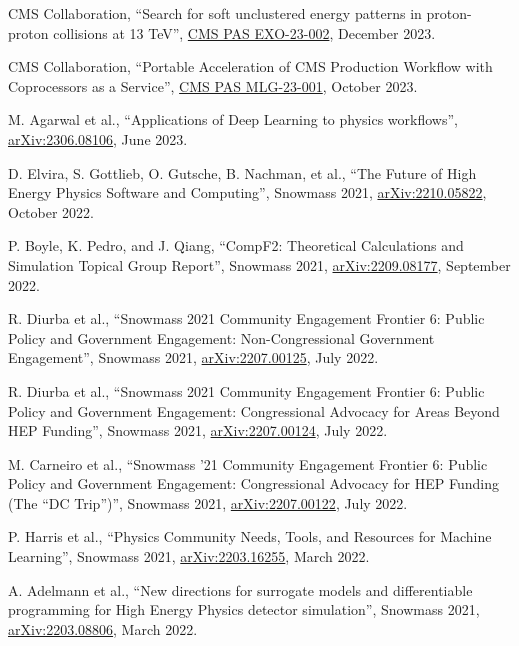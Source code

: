 \begin{description}[leftmargin=12pt,font=\normalfont,labelsep=0em]
\item CMS Collaboration, ``Search for soft unclustered energy patterns in proton-proton collisions at 13 TeV'', \href{http://cds.cern.ch/record/2883117}{CMS PAS EXO-23-002}, December 2023. %
\item CMS Collaboration, ``Portable Acceleration of CMS Production Workflow with Coprocessors as a Service'', \href{http://cds.cern.ch/record/2872973}{CMS PAS MLG-23-001}, October 2023. %
\item M. Agarwal et al., ``Applications of Deep Learning to physics workflows'', \href{https://arxiv.org/abs/2306.08106}{arXiv:2306.08106}, June 2023. %
\item D. Elvira, S. Gottlieb, O. Gutsche, B. Nachman, et al., ``The Future of High Energy Physics Software and Computing'', Snowmass 2021, \href{https://arxiv.org/abs/2210.05822}{arXiv:2210.05822}, October 2022. %
\item P. Boyle, K. Pedro, and J. Qiang, ``CompF2: Theoretical Calculations and Simulation Topical Group Report'', Snowmass 2021, \href{https://arxiv.org/abs/2209.08177}{arXiv:2209.08177}, September 2022. %
\item R. Diurba et al., ``Snowmass 2021 Community Engagement Frontier 6: Public Policy and Government Engagement: Non-Congressional Government Engagement'', Snowmass 2021, \href{https://arxiv.org/abs/2207.00125}{arXiv:2207.00125}, July 2022. %
\item R. Diurba et al., ``Snowmass 2021 Community Engagement Frontier 6: Public Policy and Government Engagement: Congressional Advocacy for Areas Beyond HEP Funding'', Snowmass 2021, \href{https://arxiv.org/abs/2207.00124}{arXiv:2207.00124}, July 2022. %
\item M. Carneiro et al., ``Snowmass '21 Community Engagement Frontier 6: Public Policy and Government Engagement: Congressional Advocacy for HEP Funding (The ``DC Trip'')'', Snowmass 2021, \href{https://arxiv.org/abs/2207.00122}{arXiv:2207.00122}, July 2022. %
\item P. Harris et al., ``Physics Community Needs, Tools, and Resources for Machine Learning'', Snowmass 2021, \href{https://arxiv.org/abs/2203.16255}{arXiv:2203.16255}, March 2022. %
\item A. Adelmann et al., ``New directions for surrogate models and differentiable programming for High Energy Physics detector simulation'', Snowmass 2021, \href{https://arxiv.org/abs/2203.08806}{arXiv:2203.08806}, March 2022. %

\end{description}
